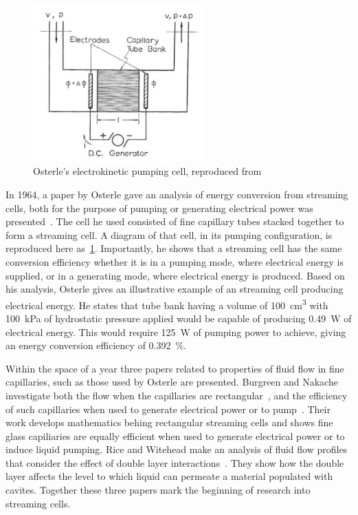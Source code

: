   \begin{figure}
    \centering
    \includegraphics[height=6cm]{content/pt1/Osterle_ElectrokineticCell.png}
    \caption{\label{fig:Osterle_cell}Osterle's electrokinetic pumping cell, reproduced from \cite{Osterle1964}}
  \end{figure}
  In 1964, a paper by Osterle gave an analysis of energy conversion from streaming cells, both for the purpose of pumping or generating electrical power was presented~\cite{Osterle1964}.
  The cell he used consisted of fine capillary tubes stacked together to form a streaming cell.
  A diagram of that cell, in its pumping configuration, is reproduced here as~\cref{fig:Osterle_cell}.
  Importantly, he shows that a streaming cell has the same conversion efficiency whether it is in a pumping mode, where electrical energy is supplied, or in a generating mode, where electrical energy is produced.
  Based on his analysis, Osterle gives an illustrative example of an streaming cell producing electrical energy.
  He states that tube bank having a volume of \SI{100}{\centi\meter\cubed} with \SI{100}{\kilo\pascal} of hydrostatic pressure applied would be capable of producing \SI{0.49}{\watt} of electrical energy.
  This would require \SI{125}{\watt} of pumping power to achieve, giving an energy conversion efficiency of \SI{0.392}{\percent}.

  Within the space of a year three papers related to properties of fluid flow in fine capillaries, such as those used by Osterle are presented.
  Burgreen and Nakache investigate both the flow when the capillaries are rectangular~\cite{Burgreen1964}, and the efficiency of such capillaries when used to generate electrical power or to pump~\cite{Burgreen1965}. 
  Their work develops mathematics behing rectangular streaming cells and shows fine glass capiliaries are equally efficient when used to generate electrical power or to induce liquid pumping.
  Rice and Witehead make an analysis of fluid flow profiles that consider the effect of double layer interactions~\cite{Rice1965}.
  They show how the double layer affects the level to which liquid can permeate a material populated with cavites.
  Together these three papers mark the beginning of research into streaming cells.

